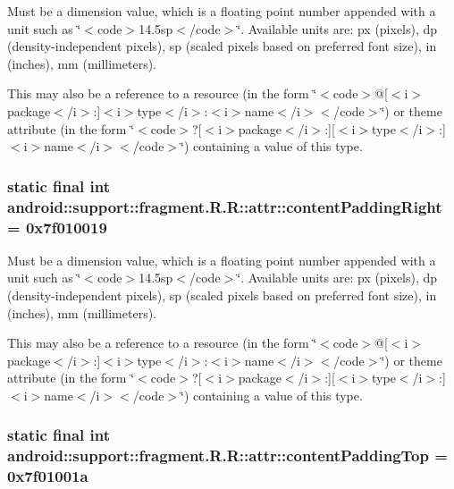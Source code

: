 Must be a dimension value, which is a floating point number appended with a unit such as \char`\"{}$<$code$>$14.5sp$<$/code$>$\char`\"{}. Available units are: px (pixels), dp (density-independent pixels), sp (scaled pixels based on preferred font size), in (inches), mm (millimeters). 

This may also be a reference to a resource (in the form \char`\"{}$<$code$>$@\mbox{[}$<$i$>$package$<$/i$>$:\mbox{]}$<$i$>$type$<$/i$>$:$<$i$>$name$<$/i$>$$<$/code$>$\char`\"{}) or theme attribute (in the form \char`\"{}$<$code$>$?\mbox{[}$<$i$>$package$<$/i$>$:\mbox{]}\mbox{[}$<$i$>$type$<$/i$>$:\mbox{]}$<$i$>$name$<$/i$>$$<$/code$>$\char`\"{}) containing a value of this type. \hypertarget{classandroid_1_1support_1_1fragment_1_1_r_1_1attr_8bfde950a94caf81d75bf3057d561e51}{
\subsubsection[{contentPaddingRight}]{\setlength{\rightskip}{0pt plus 5cm}static final int android::support::fragment.R.R::attr::contentPaddingRight = 0x7f010019}}
\label{classandroid_1_1support_1_1fragment_1_1_r_1_1attr_8bfde950a94caf81d75bf3057d561e51}


Must be a dimension value, which is a floating point number appended with a unit such as \char`\"{}$<$code$>$14.5sp$<$/code$>$\char`\"{}. Available units are: px (pixels), dp (density-independent pixels), sp (scaled pixels based on preferred font size), in (inches), mm (millimeters). 

This may also be a reference to a resource (in the form \char`\"{}$<$code$>$@\mbox{[}$<$i$>$package$<$/i$>$:\mbox{]}$<$i$>$type$<$/i$>$:$<$i$>$name$<$/i$>$$<$/code$>$\char`\"{}) or theme attribute (in the form \char`\"{}$<$code$>$?\mbox{[}$<$i$>$package$<$/i$>$:\mbox{]}\mbox{[}$<$i$>$type$<$/i$>$:\mbox{]}$<$i$>$name$<$/i$>$$<$/code$>$\char`\"{}) containing a value of this type. \hypertarget{classandroid_1_1support_1_1fragment_1_1_r_1_1attr_3462916fee9e9e0010066f3bde2b9b7d}{
\subsubsection[{contentPaddingTop}]{\setlength{\rightskip}{0pt plus 5cm}static final int android::support::fragment.R.R::attr::contentPaddingTop = 0x7f01001a}}
\label{classandroid_1_1support_1_1fragment_1_1_r_1_1attr_3462916fee9e9e0010066f3bde2b9b7d}


